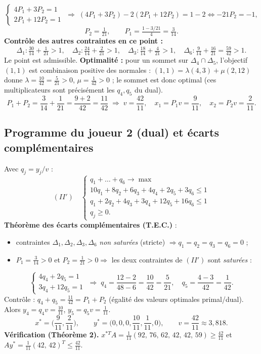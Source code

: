 \documentclass[11pt,a4paper]{article}
\begin{document}
\[\begin{cases}4P_1+3P_2=1\\ 2P_1+12P_2=1\end{cases}
\;\Rightarrow\; (4P_1+3P_2)-2(2P_1+12P_2)=1-2 \iff -21P_2=-1,
\]
\[
P_2=\tfrac1{21},\qquad P_1=\tfrac{1-3/21}{4}=\tfrac{3}{14}.
\]
\textbf{Contrôle des autres contraintes en ce point :}
\[
\Delta_1:\tfrac{30}{14}+\tfrac1{21}>1,\quad \Delta_2:\tfrac{24}{14}+\tfrac{2}{21}>1,\quad \Delta_3:\tfrac{18}{14}+\tfrac{4}{21}>1,\quad \Delta_6:\tfrac{9}{14}+\tfrac{16}{21}=\tfrac{59}{42}>1.
\]
Le point est admissible. \textbf{Optimalité :} pour un sommet sur $\Delta_4\cap\Delta_5$, l'objectif $(1,1)$ est combinaison positive des normales : $(1,1)=\lambda(4,3)+\mu(2,12)$ donne $\lambda=\frac{10}{42}=\frac5{21}>0$, $\mu=\frac1{42}>0$ ; le sommet est donc optimal (ces multiplicateurs sont précisément les $q_4,q_5$ du dual).
\[
P_1+P_2=\frac{3}{14}+\frac1{21}=\frac{9+2}{42}=\frac{11}{42}\;\Rightarrow\; v=\frac{42}{11},\quad x_1=P_1v=\frac{9}{11},\quad x_2=P_2v=\frac{2}{11}.
\]

\subsection*{Programme du joueur 2 (dual) et écarts complémentaires}
Avec $q_j=y_j/v$ :
\[
(II')\quad\begin{cases}
q_1+\dots+q_6\to\max\\
10q_1+8q_2+6q_3+4q_4+2q_5+3q_6\le1\\
q_1+2q_2+4q_3+3q_4+12q_5+16q_6\le1\\
q_j\ge0.
\end{cases}
\]
\textbf{Théorème des écarts complémentaires (T.E.C.)} :
\begin{itemize}
\item contraintes $\Delta_1,\Delta_2,\Delta_3,\Delta_6$ \emph{non saturées} (stricte) $\Rightarrow q_1=q_2=q_3=q_6=0$ ;
\item $P_1=\frac3{14}>0$ et $P_2=\frac1{21}>0\Rightarrow$ les deux contraintes de $(II')$ sont \emph{saturées} :
\end{itemize}
\[
\begin{cases}4q_4+2q_5=1\\3q_4+12q_5=1\end{cases}\;\Rightarrow\; q_4=\frac{12-2}{48-6}=\frac{10}{42}=\frac5{21},\quad q_5=\frac{4-3}{42}=\frac1{42}.
\]
Contrôle : $q_4+q_5=\frac{11}{42}=P_1+P_2$ (égalité des valeurs optimales primal/dual). Alors $y_4=q_4v=\frac{10}{11}$, $y_5=q_5v=\frac1{11}$.
\[
\boxed{x^*=\Big(\frac{9}{11},\frac{2}{11}\Big),\qquad y^*=\Big(0,0,0,\frac{10}{11},\frac{1}{11},0\Big),\qquad v=\frac{42}{11}\approx3{,}818.}
\]
\textbf{Vérification (Théorème 2).}
$x^{*T}A=\frac1{11}(92,\,76,\,62,\,42,\,42,\,59)\ge\frac{42}{11}$ et $Ay^*=\frac1{11}(42,\,42)^T\le\frac{42}{11}$. \checkmark
\end{document}
